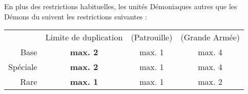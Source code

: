 \newcommand{\soulreaperrule}{%
Les \impacthits{} infligées par la figurine ont la règle \armourpiercing{6}. De plus, l'\oracle{} gagne +1 Attaque pour chaque blessure non sauvegardée causée par ces \impacthits{}. Ces attaques supplémentaires sont perdues à la fin de la Manche de Corps à Corps.
}

\newcommand{\incineratorrule}{%
\textbf{\artilleryweapon} de type \textbf{\flamethrower}.\newline
\range{8}, \Strength{} 4, \flamingattacks{}.

\vspace*{5pt}
La figurine gagne la règle \fireborn{}.
}

\newcommand{\brasscannonrule}{%
Ne peut être pris que si le Général est un Démon du \wrath{}.

\vspace*{5pt}
\textbf{\artilleryweapon} de type \textbf{\cannon{} (\distance{1D6})}.\newline
\range{48}, \Strength{} 10, \flamingattacks{}, \multiplewounds{\ordnance}{}, \armourpiercing{2}.

\vspace*{5pt}
Si le \bloodchariot{} ne fait que des Pivots et n'effectue aucun mouvement supplémentaire, il ne souffre pas de la pénalité pour bouger et tirer.
}

\newcommand{\bloodfeastrule}{%
À chaque fois que cette figurine réussit une charge, tous les Démons du \wrath{} engagés dans le même combat qu'elle gagnent la règle \frenzy{} jusqu'à la fin de la Phase de Corps à Corps.
}

\newcommand{\firstnote}{1}
\newcommand{\secondnote}{2}
\newcommand{\QRSnote}{%
\noindent$^{\firstnote}$ Un membre d'équipage de moins quand il sert de monture.

\noindent$^{\secondnote}$ Pas d'\igniter{} quand il sert de monture.
}












\startarmywiderules

\spaceaftersection{}

En plus des restrictions habituelles, les unités Démoniaques autres que les Démons du \truechaos{} suivent les restrictions suivantes :

\vspace*{0.2cm}
\renewcommand{\arraystretch}{2}
\begin{center}\begin{tabular}{rccc}
\hline
 & Limite de duplication & (Patrouille) & (Grande Armée) \tabularnewline
 Base & \textbf{max. 2} & max. 1 & max. 4 \tabularnewline
 Spéciale & \textbf{max. 2} & max. 1 & max. 4 \tabularnewline
 Rare & \textbf{max. 1} & max. 1 & max. 2 \tabularnewline
\hline
\end{tabular}\end{center}
\renewcommand{\arraystretch}{1.2}
\vspace*{0.2cm}

